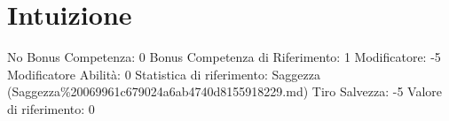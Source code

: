 \section{Intuizione}\label{intuizione}

\begin{description}
\tightlist
\item[Tags: ABI]
No Bonus Competenza: 0 Bonus Competenza di Riferimento: 1 Modificatore:
-5 Modificatore Abilità: 0 Statistica di riferimento: Saggezza
(Saggezza\%20069961c679024a6ab4740d8155918229.md) Tiro Salvezza: -5
Valore di riferimento: 0
\end{description}
